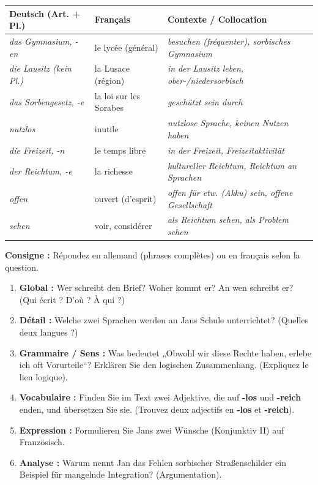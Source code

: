 \documentclass[11pt]{article}
\newcounter{popsec}
\newcounter{popsub}
\newcommand{\courssub}[1]{%
  \stepcounter{popsub}%
  \par\vspace{9pt}\noindent{\popxbold\fontsize{11.5}{13}\selectfont\color{popink}{\color{poporange}\thepopsec.\thepopsub}\hspace{6pt}#1}\par\nopagebreak\vspace{4pt}
}
\newcommand{\all}[1]{\ifmmode\text{\textit{#1}}\else\begingroup\selectlanguage{ngerman}\itshape #1\endgroup\fi}
\begin{document}
\begin{definition}
\begin{center}
\begin{tabularx}{\linewidth}{|l|l|X|}
\hline
\rowcolor{poppurpleL} \textbf{Deutsch (Art. + Pl.)} & \textbf{Français} & \textbf{Contexte / Collocation} \\ \hline
\all{das Gymnasium, -en} & le lycée (général) & \all{besuchen} (fréquenter), \all{sorbisches Gymnasium} \\ \hline
\all{die Lausitz (kein Pl.)} & la Lusace (région) & \all{in der Lausitz leben}, \all{ober-/niedersorbisch} \\ \hline
\all{das Sorbengesetz, -e} & la loi sur les Sorabes & \all{geschützt sein durch} \\ \hline
\all{nutzlos} & inutile & \all{nutzlose Sprache}, \all{keinen Nutzen haben} \\ \hline
\all{die Freizeit, -n} & le temps libre & \all{in der Freizeit}, \all{Freizeitaktivität} \\ \hline
\all{der Reichtum, -e} & la richesse & \all{kultureller Reichtum}, \all{Reichtum an Sprachen} \\ \hline
\all{offen} & ouvert (d'esprit) & \all{offen für etw. (Akku) sein}, \all{offene Gesellschaft} \\ \hline
\all{sehen} & voir, considérer & \all{als Reichtum sehen}, \all{als Problem sehen} \\ \hline
\end{tabularx}
\end{center}
\end{definition}

\courssub{Compréhension du texte}
\begin{exercice}
\textbf{Consigne :} Répondez en allemand (phrases complètes) ou en français selon la question.
\begin{enumerate}
    \item \textbf{Global :} Wer schreibt den Brief? Woher kommt er? An wen schreibt er? (Qui écrit ? D'où ? À qui ?)
    \item \textbf{Détail :} Welche zwei Sprachen werden an Jans Schule unterrichtet? (Quelles deux langues ?)
    \item \textbf{Grammaire / Sens :} Was bedeutet „Obwohl wir diese Rechte haben, erlebe ich oft Vorurteile“? Erklären Sie den logischen Zusammenhang. (Expliquez le lien logique).
    \item \textbf{Vocabulaire :} Finden Sie im Text zwei Adjektive, die auf \textbf{-los} und \textbf{-reich} enden, und übersetzen Sie sie. (Trouvez deux adjectifs en \textbf{-los} et \textbf{-reich}).
    \item \textbf{Expression :} Formulieren Sie Jans zwei Wünsche (Konjunktiv II) auf Französisch.
    \item \textbf{Analyse :} Warum nennt Jan das Fehlen sorbischer Straßenschilder ein Beispiel für mangelnde Integration? (Argumentation).
\end{enumerate}
\end{exercice}
\end{document}
